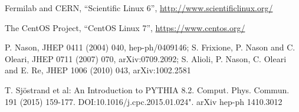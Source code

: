 \begin{thebibliography}{}
Fermilab and CERN,
``Scientific Linux 6'',
\url{http://www.scientificlinux.org/}

The CentOS Project,
``CentOS Linux 7'',
\url{https://www.centos.org/}

   P. Nason, JHEP 0411 (2004) 040, hep-ph/0409146;
    S. Frixione, P. Nason and C. Oleari, JHEP 0711 (2007) 070, arXiv:0709.2092;
    S. Alioli, P. Nason, C. Oleari and E. Re, JHEP 1006 (2010) 043, arXiv:1002.2581

T. Sjöstrand et al: An Introduction to PYTHIA 8.2. Comput. Phys. Commun. 191 (2015) 159-177. DOI:10.1016/j.cpc.2015.01.024". arXiv hep-ph 1410.3012




\end{thebibliography}



